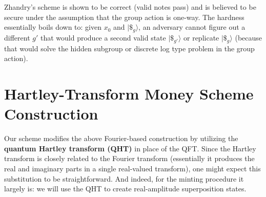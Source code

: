 \documentclass[11pt]{article}
\theoremstyle{definition}
\begin{document}
Zhandry’s scheme is shown to be correct (valid notes pass) and is believed to be secure under the assumption that the group action is one-way. The hardness essentially boils down to: given $x_0$ and $|\$_g\rangle$, an adversary cannot figure out a different $g'$ that would produce a second valid state $|\$_{g'}\rangle$ or replicate $|\$_g\rangle$ (because that would solve the hidden subgroup or discrete log type problem in the group action).

\section{Hartley-Transform Money Scheme Construction}
Our scheme modifies the above Fourier-based construction by utilizing the \textbf{quantum Hartley transform (QHT)} in place of the QFT. Since the Hartley transform is closely related to the Fourier transform (essentially it produces the real and imaginary parts in a single real-valued transform), one might expect this substitution to be straightforward. And indeed, for the minting procedure it largely is: we will use the QHT to create real-amplitude superposition states.
\end{document}
